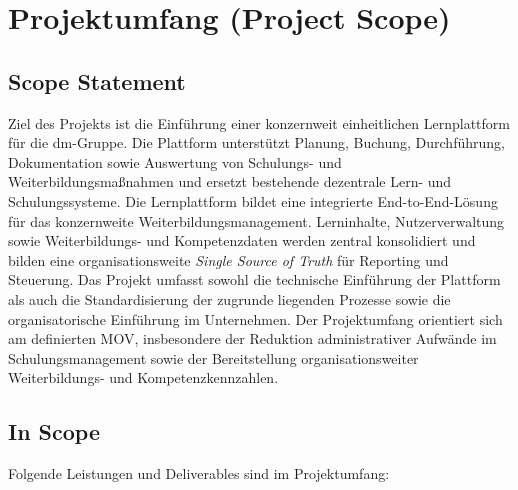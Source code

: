 
\chapter{Projektumfang (Project Scope)}

\section{Scope Statement}

Ziel des Projekts ist die Einführung einer konzernweit einheitlichen Lernplattform für die dm-Gruppe. Die Plattform unterstützt Planung, Buchung, Durchführung, Dokumentation sowie Auswertung von Schulungs- und Weiterbildungsmaßnahmen und ersetzt bestehende dezentrale Lern- und Schulungssysteme.
Die Lernplattform bildet eine integrierte End-to-End-Lösung für das konzernweite Weiterbildungsmanagement. Lerninhalte, Nutzerverwaltung sowie Weiterbildungs- und Kompetenzdaten werden zentral konsolidiert und bilden eine organisationsweite \textit{Single Source of Truth} für Reporting und Steuerung.
Das Projekt umfasst sowohl die technische Einführung der Plattform als auch die Standardisierung der zugrunde liegenden Prozesse sowie die organisatorische Einführung im Unternehmen. Der Projektumfang orientiert sich am definierten \ac{MOV}, insbesondere der Reduktion administrativer Aufwände im Schulungsmanagement sowie der Bereitstellung organisationsweiter Weiterbildungs- und Kompetenzkennzahlen.

\section{In Scope}

Folgende Leistungen und Deliverables sind im Projektumfang:

